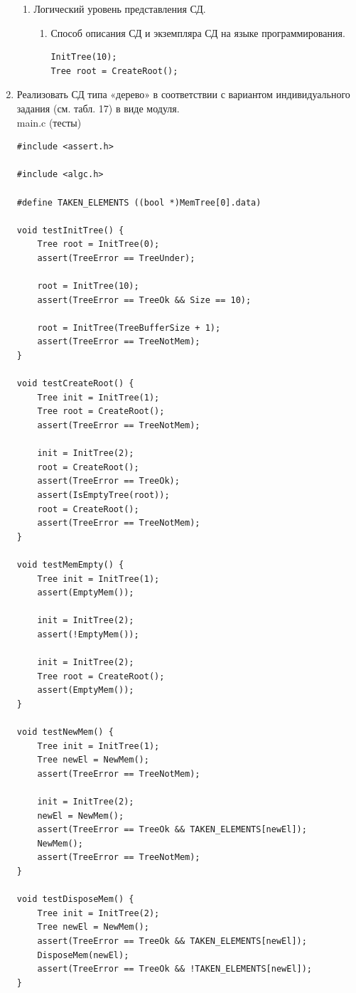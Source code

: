 \documentclass[a4paper,14pt]{extarticle}
\begin{document}
\begin{enumerate}
\begin{enumerate}[label*=\arabic*.]
		      \item Логический уровень представления СД.
		            \begin{enumerate}[label*=\arabic*.]
			            \item Способ описания СД и экземпляра СД на языке программирования.\\
						\begin{verbatim}
InitTree(10);
Tree root = CreateRoot();
												  \end{verbatim}
		            \end{enumerate}
	      \end{enumerate}
		  \item Реализовать СД типа «дерево» в соответствии с 
          вариантом индивидуального задания (см. табл. 17) в виде модуля.\\
main.c (тесты)
		  \begin{verbatim}
#include <assert.h>

#include <algc.h>

#define TAKEN_ELEMENTS ((bool *)MemTree[0].data)

void testInitTree() {
    Tree root = InitTree(0);
    assert(TreeError == TreeUnder);

    root = InitTree(10);
    assert(TreeError == TreeOk && Size == 10);

    root = InitTree(TreeBufferSize + 1);
    assert(TreeError == TreeNotMem);
}

void testCreateRoot() {
    Tree init = InitTree(1);
    Tree root = CreateRoot();
    assert(TreeError == TreeNotMem);

    init = InitTree(2);
    root = CreateRoot();
    assert(TreeError == TreeOk);
    assert(IsEmptyTree(root));
    root = CreateRoot();
    assert(TreeError == TreeNotMem);
}

void testMemEmpty() {
    Tree init = InitTree(1);
    assert(EmptyMem());

    init = InitTree(2);
    assert(!EmptyMem());

    init = InitTree(2);
    Tree root = CreateRoot();
    assert(EmptyMem());
}

void testNewMem() {
    Tree init = InitTree(1);
    Tree newEl = NewMem();
    assert(TreeError == TreeNotMem);

    init = InitTree(2);
    newEl = NewMem();
    assert(TreeError == TreeOk && TAKEN_ELEMENTS[newEl]);
    NewMem();
    assert(TreeError == TreeNotMem);
}

void testDisposeMem() {
    Tree init = InitTree(2);
    Tree newEl = NewMem();
    assert(TreeError == TreeOk && TAKEN_ELEMENTS[newEl]);
    DisposeMem(newEl);
    assert(TreeError == TreeOk && !TAKEN_ELEMENTS[newEl]);
}


\end{verbatim}
\end{enumerate}
\end{document}
